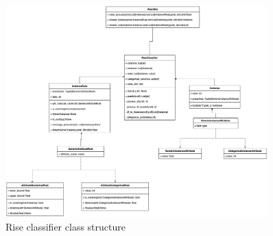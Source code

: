 \documentclass{article}
\begin{document}
\begin{figure}[htbp]
    \centering
    \includegraphics[width=0.9\textwidth]{media/sel.png}
    \caption{Rise classifier class structure}
    \label{fig:class_structure}
\end{figure}
\end{document}
